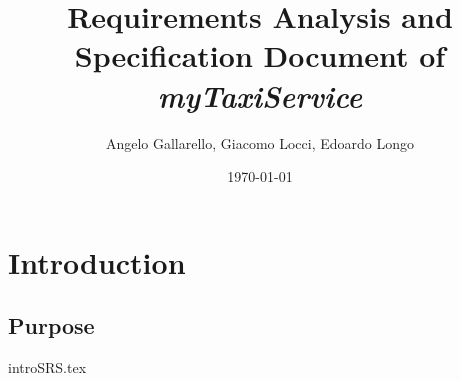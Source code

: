\documentclass[12pt, a4paper]{article}
\begin{document}
\title{Requirements Analysis and Specification Document of \emph{myTaxiService}}

\author{Angelo Gallarello, Giacomo Locci, Edoardo Longo}
\date{\today}
\maketitle
\tableofcontents

\section{Introduction}

\subsection{Purpose}
{introSRS.tex}



\end{document}
